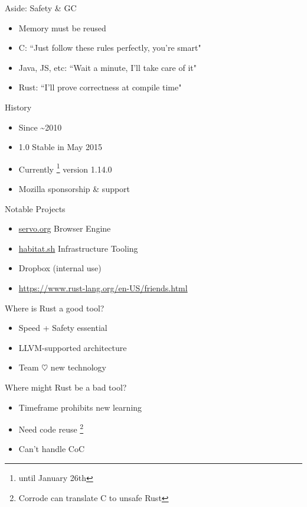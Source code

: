 \documentclass[aspectratio=169]{beamer}
\begin{document}
\begin{frame}
    Aside: Safety \& GC
    \begin{itemize}
        \item Memory must be reused
        \item C: ``Just follow these rules perfectly, you're smart"
        \item Java, JS, etc: ``Wait a minute, I'll take care of it"
        \item Rust: ``I'll prove correctness at compile time"
    \end{itemize}
\end{frame}

\begin{frame}
    History
    \begin{itemize}
        \item Since \textasciitilde 2010
        \item 1.0 Stable in May 2015
        \item Currently \footnote{until January 26th} version 1.14.0
        \item Mozilla sponsorship \& support
    \end{itemize}
\end{frame}

\begin{frame}
    Notable Projects
    \begin{itemize}
        \item \url{servo.org} Browser Engine
        \item \url{habitat.sh} Infrastructure Tooling
        \item Dropbox (internal use)
        \item \url{https://www.rust-lang.org/en-US/friends.html}
    \end{itemize}
\end{frame}

\begin{frame}
    Where is Rust a good tool?
    \begin{itemize}
        \item Speed + Safety essential
        \item LLVM-supported architecture
        \item Team $\heartsuit$ new technology
    \end{itemize}
\end{frame}

\begin{frame}
    Where might Rust be a bad tool?
    \begin{itemize}
        \item Timeframe prohibits new learning
        \item Need code reuse \footnote{Corrode can translate C to unsafe Rust}
        \item Can't handle CoC
    \end{itemize}
\end{frame}
\end{document}
